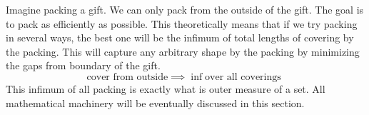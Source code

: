 \begin{analogy}
    Imagine packing a gift. We can only pack from the outside of the gift. The goal is to pack as efficiently as possible. This theoretically means that if we try packing in several ways, the best one will be the infimum of total lengths of covering by the packing. This will capture any arbitrary shape by the packing by minimizing the gaps from boundary of the gift. 
    \[
    \text{cover from outside}\implies \inf\text{over all coverings }
    \]
    This infimum of all packing is exactly what is outer measure of a set. All mathematical machinery will be eventually discussed in this section. 
\end{analogy}